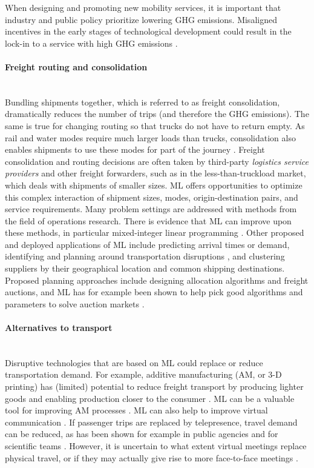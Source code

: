 \documentclass[11pt]{report}
\newcommand{\Gap}{\texorpdfstring{\hfill}{}}
\newcommand{\Rec}{\texorpdfstring{{\small\emph{\color{blue}{\fbox{High Leverage}}}}}{}}
\newcommand{\HighRisk}{\texorpdfstring{{\small\emph{\color{orange}{\fbox{Uncertain Impact}}}}}{}}
\begin{document}
When designing and promoting new mobility services, it is important that industry and public policy prioritize lowering GHG emissions. Misaligned incentives in the early stages of technological development could result in the lock-in to a service with high GHG emissions \cite{AXSEN20191, 10.2307/2234208}.



\paragraph*{Freight routing and consolidation}\Gap\textbf{\Rec}\mbox{}\\Bundling shipments together, which is referred to as freight consolidation, dramatically reduces the number of trips (and therefore the GHG emissions). The same is true for changing routing so that trucks do not have to return empty. As rail and water modes require much larger loads than trucks, consolidation also enables shipments to use these modes for part of the journey \cite{kaack2018decarbonizing}. Freight consolidation and routing decisions are often taken by third-party \emph{logistics service providers} and other freight forwarders, such as in the less-than-truckload market, which deals with shipments of smaller sizes. ML offers opportunities to optimize this complex interaction of shipment sizes, modes, origin-destination pairs, and service requirements. Many problem settings are addressed with methods from the field of operations research. There is evidence that ML can improve upon these methods, in particular mixed-integer linear programming \cite{2018arXiv181106128B}. Other proposed and deployed applications of ML include predicting arrival times or demand, identifying and planning around transportation disruptions \cite{DHL}, and clustering suppliers by their geographical location and common shipping destinations. Proposed planning approaches include designing allocation algorithms and freight auctions, and ML has for example been shown to help pick good algorithms and parameters to solve auction markets \cite{Sandholm_very-large-scalegeneralized}. 



\paragraph*{Alternatives to transport}\Gap\textbf{\HighRisk}\mbox{}\\Disruptive technologies that are based on ML could replace or reduce transportation demand. 
For example, additive manufacturing (AM, or 3-D printing) has (limited) potential to reduce freight transport by producing lighter goods and enabling production closer to the consumer \cite{kaack2018decarbonizing}. ML can be a valuable tool for improving AM processes \cite{PhysRevLett.120.145301}. ML can also help to improve virtual communication \cite{Shiarlis}. If passenger trips are replaced by telepresence, travel demand can be reduced, as has been shown for example in public agencies \cite{ARNFALK2016101} and for scientific teams \cite{Marlow4841}. However, it is uncertain to what extent virtual meetings replace physical travel, or if they may actually give rise to more face-to-face meetings \cite{doi:10.1080/17450101.2014.902655}.
\end{document}
